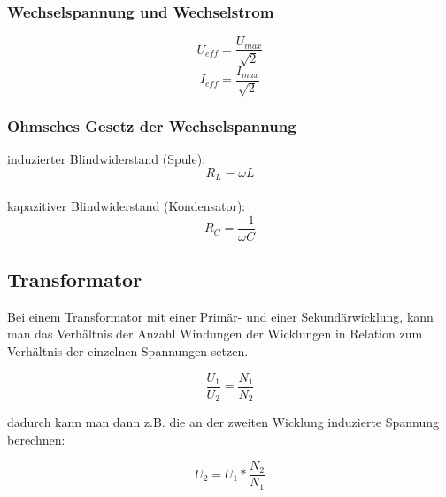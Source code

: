 \subsubsection{Wechselspannung und Wechselstrom}
$$U_{eff} = \frac{U_{max}}{\sqrt{2}}$$
$$I_{eff} = \frac{I_{max}}{\sqrt{2}}$$

\subsubsection{Ohmsches Gesetz der Wechselspannung}
induzierter Blindwiderstand (Spule):
$$R_{L} = \omega L$$ \\
kapazitiver Blindwiderstand (Kondensator):
$$R_{C} = \frac{-1}{\omega C}$$

\subsection{Transformator}
Bei einem Transformator mit einer Primär- und einer Sekundärwicklung, kann man das Verhältnis der Anzahl Windungen der Wicklungen in Relation zum Verhältnis der einzelnen Spannungen setzen.

$$\frac{U_{1}}{U_{2}}=\frac{N_{1}}{N_{2}}$$

dadurch kann man dann z.B. die an der zweiten Wicklung induzierte Spannung berechnen: 

$$U_{2} = U_{1} * \frac{N_{2}}{N_{1}}$$
